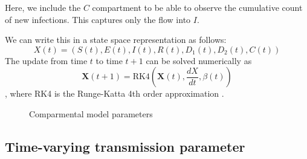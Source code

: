 \documentclass[11pt]{amsart}
\begin{document}
Here, we include the $C$ compartment to be able to observe the cumulative count of new infections. This captures only the flow into $I$.

We can write this in a state space representation as follows: \[
X(t) = (S(t), E(t), I(t), R(t), D_1(t), D_2(t), C(t))
\]
The update from time $t$ to time $t+1$ can be solved numerically as
\begin{equation}
\bm{X}(t+1)= \text{RK4}\left(\bm{X}(t),\frac{dX}{dt},\beta(t)\right)
\end{equation},
where RK4 is the Runge-Katta 4th order approximation \cite{phan2019composable}.


\begin{figure}
 \begin{center}
\end{center}
      \caption{Comparmental model parameters }
     \label{fig:seird}
 \end{figure}
 
 
 
 

 
 \subsection{Time-varying transmission parameter}
 
\end{document}
